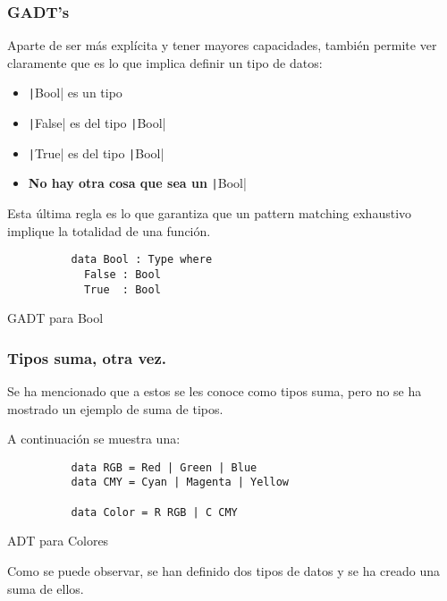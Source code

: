 \documentclass{beamer}
\begin{document}
\begin{frame}[fragile]
  \frametitle{GADT's}

  Aparte de ser más explícita y tener mayores capacidades, también permite ver
  claramente que es lo que implica definir un tipo de datos:
  \begin{itemize}
    \item \texttt|Bool| es un tipo
    \item \texttt|False| es del tipo \texttt|Bool|
    \item \texttt|True| es del tipo \texttt|Bool|
    \item \textbf{No hay otra cosa que sea un} \texttt|Bool|
  \end{itemize}
  Esta última regla es lo que garantiza que un pattern matching exhaustivo implique
  la totalidad de una función.

  \begin{listing}[H]
    \begin{center}
      \begin{minipage}{0.42\textwidth}
          \begin{verbatim}
          data Bool : Type where
            False : Bool
            True  : Bool
          \end{verbatim}
      \end{minipage}
    \end{center}
    \caption{GADT para Bool}
    \label{lst:catchalltotal}
  \end{listing}
\end{frame}

\begin{frame}[fragile]
  \frametitle{Tipos suma, otra vez.}

  Se ha mencionado que a estos se les conoce como tipos suma, pero no se ha mostrado
  un ejemplo de suma de tipos.

  A continuación se muestra una:

  \begin{listing}[H]
    \begin{center}
      \begin{minipage}{0.42\textwidth}
          \begin{verbatim}
          data RGB = Red | Green | Blue
          data CMY = Cyan | Magenta | Yellow

          data Color = R RGB | C CMY
          \end{verbatim}
      \end{minipage}
    \end{center}
    \caption{ADT para Colores}
    \label{lst:catchalltotal}
  \end{listing}

  Como se puede observar, se han definido dos tipos de datos y se ha creado una suma de
  ellos.
\end{frame}
\end{document}
